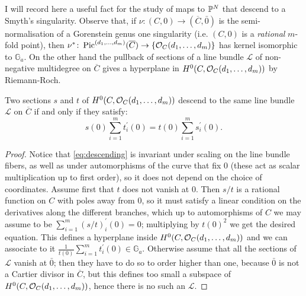 I will record here a useful fact for the study of maps to $\mathbb P^N$ that descend to a Smyth's singularity. Observe that, if $\nu\colon (C,0)\to (\overline{C},\bar{0})$ is the semi-normalisation of a Gorenstein genus one singularity (i.e. $(C,0)$ is a \emph{rational} $m$-fold point), then $\nu^*\colon \operatorname{Pic}^{(d_1,\ldots,d_m)}(\overline{C})\rightarrow \{\mathcal{O}_{C}(d_1,\ldots,d_m)\}$ has kernel isomorphic to $\mathbb G_a$. On the other hand the pullback of sections of a line bundle $\mathcal L$ of non-negative multidegree on $\overline{C}$ gives a hyperplane in $H^0(C,\mathcal{O}_{C}(d_1,\ldots,d_m))$ by Riemann-Roch.
\begin{lemma}\label{lem:fundamental}
 Two sections $s$ and $t$ of $H^0(C,\mathcal{O}_{C}(d_1,\ldots,d_m))$ descend to the same line bundle $\mathcal L$ on $\overline{C}$ if and only if they satisfy: \begin{equation}\label{eq:descending}s(0)\sum_{i=1}^m t_i^\prime(0)=t(0)\sum_{i=1}^m s_i^\prime(0).\end{equation}
\end{lemma}
\begin{proof}
 Notice that \eqref{eq:descending} is invariant under scaling on the line bundle fibers, as well as under automorphisms of the curve that fix $0$ (these act as scalar multiplication up to first order), so it does not depend on the choice of coordinates. Assume first that $t$ does not vanish at $0$. Then $s/t$ is a rational function on $C$ with poles away from $0$, so it must satisfy a linear condition on the derivatives along the different branches, which up to automorphisms of $C$ we may assume to be $\sum_{i=1}^m (s/t)_i^\prime(0)=0$; multiplying by $t(0)^2$ we get the desired equation. This defines a hyperplane inside $H^0(C,\mathcal{O}_{C}(d_1,\ldots,d_m))$ and we can associate to it $\frac{1}{t(0)}\sum_{i=1}^m t_i^\prime(0)\in \mathbb G_a$. Otherwise assume that all the sections of $\mathcal L$ vanish at $\bar{0}$; then they have to do so to order higher than one, because $\bar{0}$ is not a Cartier divisor in $\overline{C}$, but this defines too small a subspace of $H^0(C,\mathcal{O}_{C}(d_1,\ldots,d_m))$, hence there is no such an $\mathcal L$.
\end{proof}

